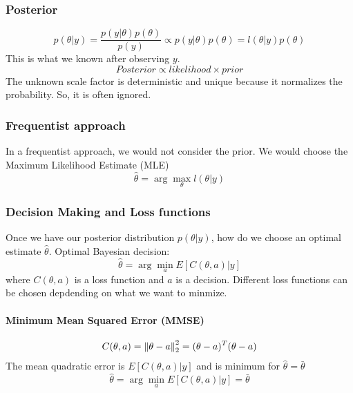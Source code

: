 \subsubsection{Posterior}
\begin{equation}
    p(\theta|y) = \frac{p(y|\theta)p(\theta)}{p(y)} \propto p(y|\theta)p(\theta) = l(\theta|y)p(\theta)
\end{equation}
This is what we known after observing $y$.
\begin{equation}
    Posterior \propto likelihood \times prior
\end{equation}
The unknown scale factor is deterministic and unique because it normalizes the probability. So, it is often ignored.

\subsubsection{Frequentist approach} In a frequentist approach, we would not consider the prior. We would choose the Maximum Likelihood Estimate (MLE)
\begin{equation}
    \hat{\theta} = \arg\max_{\theta} l(\theta|y)
\end{equation}

\subsubsection{Decision Making and Loss functions}
Once we have our posterior distribution $p(\theta|y)$, how do we choose an optimal estimate $\hat{\theta}$. Optimal Bayesian decision:
\begin{equation}
    \hat{\theta} = \arg\min_{a} E[C(\theta, a) | y]
\end{equation}
where $C(\theta, a)$ is a loss function and $a$ is a decision. Different loss functions can be chosen depdending on what we want to minmize. 

\paragraph{Minimum Mean Squared Error (MMSE)}
\begin{equation}
    C(\theta, a) = \left\lVert\theta-a\right\rVert^2_2 = (\theta-a)^T(\theta-a)
\end{equation}
The mean quadratic error is $E[C(\theta, a)|y]$ and is minimum for $\hat{\theta}=\bar{\theta}$
\begin{equation}
    \hat{\theta} = \arg\min_{a} E[C(\theta, a)|y] = \bar{\theta}
\end{equation}


